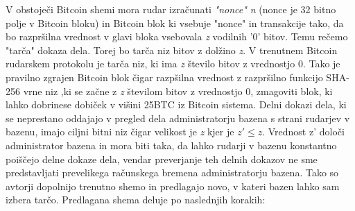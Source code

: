 \documentclass{acm_proc_article-sp}
\begin{document}
V obstoječi Bitcoin shemi mora rudar izračunati \textit{"nonce" n} (nonce je 32 bitno polje v Bitcoin bloku)  in Bitcoin blok ki vsebuje "nonce" in transakcije tako, da bo razpršilna vrednost v glavi bloka vsebovala \textit{z} vodilnih '0' bitov. Temu rečemo "tarča" dokaza dela. Torej bo tarča niz bitov z dolžino \textit{z}. V trenutnem Bitcoin rudarskem protokolu je tarča niz, ki ima \textit{z} število bitov z vrednostjo 0. Tako je pravilno zgrajen Bitcoin blok čigar razpšilna vrednost z razpršilno funkcijo SHA-256 vrne niz ,ki se začne z \textit{z} številom bitov z vrednostjo 0, zmagoviti blok, ki lahko dobrinese dobiček v višini 25BTC iz Bitcoin sistema. Delni dokazi dela, ki se neprestano oddajajo v pregled dela  administratorju bazena  s strani rudarjev v bazenu, imajo ciljni bitni niz čigar velikost je \textit{z} kjer je {$ z' \le z $}. Vrednost z' določi administrator bazena in mora biti taka, da lahko rudarji v bazenu konstantno poiščejo delne dokaze dela, vendar preverjanje teh delnih dokazov ne sme predstavljati prevelikega računskega bremena administratorju bazena. Tako so avtorji \cite{originalarticle} dopolnijo trenutno shemo in predlagajo novo, v kateri bazen lahko sam izbera tarčo. Predlagana shema deluje po naslednjih korakih:
\end{document}

